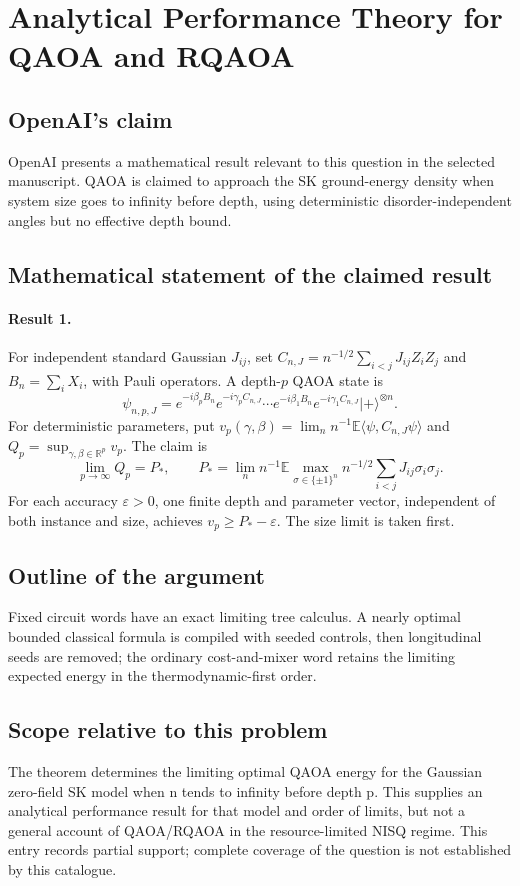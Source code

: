 \documentclass[11pt]{article}
\begin{document}
\section*{Analytical Performance Theory for QAOA and RQAOA}

\subsection{OpenAI's claim}
OpenAI presents a mathematical result relevant to this question in the selected manuscript. QAOA is claimed to approach the SK ground-energy density when system size goes to infinity before depth, using deterministic disorder-independent angles but no effective depth bound.

\subsection{Mathematical statement of the claimed result}
\paragraph{Result 1.} For independent standard Gaussian \(J_{ij}\), set \(C_{n,J}=n^{-1/2}\sum_{i<j}J_{ij}Z_iZ_j\) and \(B_n=\sum_iX_i\), with Pauli operators. A depth-\(p\) QAOA state is
\[
 \psi_{n,p,J}=e^{-i\beta_pB_n}e^{-i\gamma_pC_{n,J}}\cdots
 e^{-i\beta_1B_n}e^{-i\gamma_1C_{n,J}}|+\rangle^{\otimes n}.
\]
For deterministic parameters, put \(v_p(\gamma,\beta)=\lim_n n^{-1}\mathbb E\langle\psi,C_{n,J}\psi\rangle\) and \(Q_p=\sup_{\gamma,\beta\in\mathbb R^p}v_p\). The claim is
\[
 \lim_{p\to\infty}Q_p=P_*,\qquad
 P_*=\lim_n n^{-1}\mathbb E\max_{\sigma\in\{\pm1\}^n}
 n^{-1/2}\sum_{i<j}J_{ij}\sigma_i\sigma_j.
\]
For each accuracy \(\varepsilon>0\), one finite depth and parameter vector, independent of both instance and size, achieves \(v_p\ge P_*-\varepsilon\). The size limit is taken first.

\subsection{Outline of the argument}
Fixed circuit words have an exact limiting tree calculus. A nearly optimal bounded classical formula is compiled with seeded controls, then longitudinal seeds are removed; the ordinary cost-and-mixer word retains the limiting expected energy in the thermodynamic-first order.

\subsection{Scope relative to this problem}
The theorem determines the limiting optimal QAOA energy for the Gaussian zero-field SK model when n tends to infinity before depth p. This supplies an analytical performance result for that model and order of limits, but not a general account of QAOA/RQAOA in the resource-limited NISQ regime. This entry records partial support; complete coverage of the question is not established by this catalogue.
\end{document}
